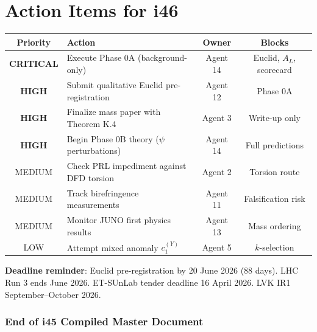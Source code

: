 \documentclass[11pt,a4paper]{article}
\begin{document}
\part{Action Items for i46}

\begin{center}
\begin{tabular}{clcc}
\toprule
\textbf{Priority} & \textbf{Action} & \textbf{Owner} & \textbf{Blocks} \\
\midrule
\textbf{CRITICAL} & Execute Phase 0A (background-only) & Agent 14 & Euclid, $A_L$, scorecard \\
\textbf{HIGH} & Submit qualitative Euclid pre-registration & Agent 12 & Phase 0A \\
\textbf{HIGH} & Finalize mass paper with Theorem K.4 & Agent 3 & Write-up only \\
\textbf{HIGH} & Begin Phase 0B theory ($\psi$ perturbations) & Agent 14 & Full predictions \\
MEDIUM & Check PRL impediment against DFD torsion & Agent 2 & Torsion route \\
MEDIUM & Track birefringence measurements & Agent 11 & Falsification risk \\
MEDIUM & Monitor JUNO first physics results & Agent 13 & Mass ordering \\
LOW & Attempt mixed anomaly $c_1^{(Y)}$ & Agent 5 & $k$-selection \\
\bottomrule
\end{tabular}
\end{center}

\textbf{Deadline reminder}: Euclid pre-registration by 20 June 2026 (88 days). LHC Run 3 ends June 2026. ET-SUnLab tender deadline 16 April 2026. LVK IR1 September--October 2026.


\section*{End of i45 Compiled Master Document}
\end{document}
